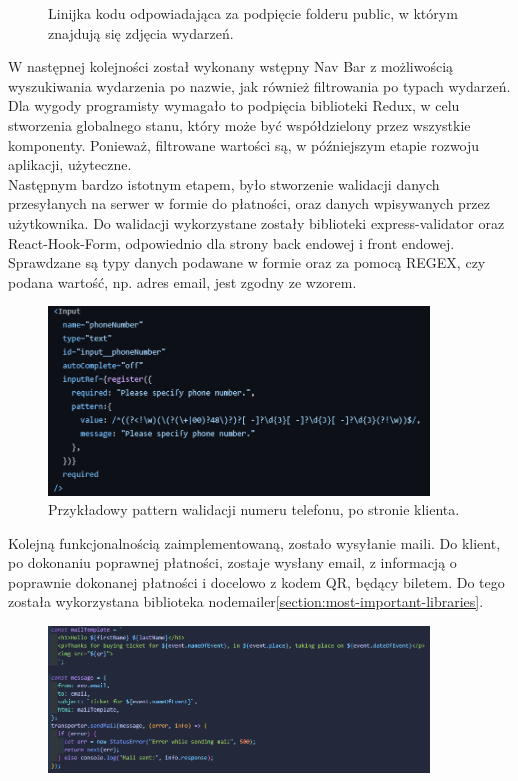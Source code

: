 \documentclass[12pt]{article}
\begin{document}
\begin{sloppypar}
{\begin{figure}[H]
    \caption{Linijka kodu odpowiadająca za podpięcie folderu public, w którym znajdują się zdjęcia wydarzeń.}
    \label{fig:static-folder}
  \end{figure}
  W następnej kolejności został wykonany wstępny Nav Bar z możliwością wyszukiwania wydarzenia po nazwie, jak również filtrowania po typach wydarzeń. Dla wygody 
  programisty wymagało to podpięcia biblioteki Redux, w celu stworzenia globalnego stanu, który może być współdzielony przez wszystkie komponenty. 
  Ponieważ, filtrowane wartości są, w późniejszym etapie rozwoju aplikacji, użyteczne.\\
  Następnym bardzo istotnym etapem, było stworzenie walidacji danych przesyłanych na serwer w formie do płatności, oraz danych wpisywanych przez użytkownika.
  Do walidacji wykorzystane zostały biblioteki express-validator oraz React-Hook-Form, odpowiednio dla strony back endowej i front endowej. 
  Sprawdzane są typy danych podawane w formie oraz za pomocą REGEX, czy podana wartość, np. adres email, jest zgodny ze wzorem.
  \begin{figure}[H]
    \centering
    \includegraphics[width=0.9\textwidth]{Creation_process/client_validation.PNG}
    \caption{Przykładowy pattern walidacji numeru telefonu, po stronie klienta.}
    \label{fig:client-validation}
  \end{figure}
  Kolejną funkcjonalnością zaimplementowaną, zostało wysyłanie maili. 
  Do klient, po dokonaniu poprawnej płatności, zostaje wysłany email, z informacją o poprawnie dokonanej płatności i docelowo z kodem QR, będący biletem.
  Do tego została wykorzystana biblioteka nodemailer\ref{section:most-important-libraries}.
  \begin{figure}[H]
    \centering
    \includegraphics[width=0.9\textwidth]{Creation_process/sending_email.PNG}

\end{figure}}
\end{sloppypar}
\end{document}
